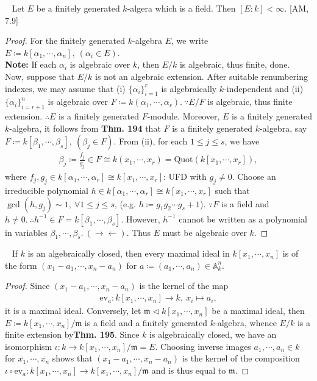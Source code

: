 \documentclass[12pt,a4paper,footinclude=true,headinclude=true]{scrbook} %
\newenvironment{theorem}[2][]
{\renewcommand\theinnercustomthm{#2}\innercustomthm[#1]
\begin{mdframed}[backgroundcolor=yellow!20]\ }
{\end{mdframed}\endinnercustomthm}
\newenvironment{corollary}[2][]
{\renewcommand\theinnercustomcol{#2}\innercustomcol[#1]
\begin{mdframed}[backgroundcolor=gray!20]\ }
{\end{mdframed}\endinnercustomcol}
\begin{document}
\begin{theorem}{195. (Hilbert Weak Nullstellensatz)}
    Let $E$ be a finitely generated $k$-algera which is a field. Then $[E:k]<\infty$. [AM, 7.9]
\end{theorem}
\begin{proof}
    For the finitely generated $k$-algebra $E$, we write $E\coloneqq k[\alpha_1,\cdots,\alpha_n],\ (\alpha_i\in E)$.\\ \textbf{Note:} If each $\alpha_i$ is algebraic over $k$, then $E/k$ is algebraic, thus finite, done.\\ Now, suppose that $E/k$ is not an algebraic extension. After suitable renumbering indexes, we may assume that (i) $\{\alpha_i\}_{i=1}^r$ is algebraically $k$-independent and (ii) $\{\alpha_i\}_{i=r+1}^n$ is algebraic over $F\coloneqq k(\alpha_1,\cdots,\alpha_r).\ \because E/F$ is algebraic, thus finite extension. $\therefore E$ is a finitely generated $F$-module. Moreover, $E$ is a finitely generated $k$-algebra, it follows from \textbf{Thm. 194} that $F$ is a finitely generated $k$-algebra, say $F\coloneqq k[\beta_1,\cdots,\beta_s],\ (\beta_j\in F)$. From (ii), for each $1\leq j\leq s$, we have 
    \begin{align*}
        \beta_j\coloneqq\tfrac{f_j}{g_j}\in F\cong k(x_1,\cdots,x_r) =\mathrm{Quot}(k[x_1,\cdots,x_r]),
    \end{align*}
    where $f_j,g_j\in k[\alpha_1,\cdots,\alpha_r]\cong k[x_1,\cdots,x_r]$: UFD with $g_j\neq0$. Choose an irreducible polynomial $h\in k[\alpha_1,\cdots,\alpha_r]\cong k[x_1,\cdots,x_r]$ such that $\gcd{(h,g_j)}\sim1,\ \forall 1\leq j\leq s$, (e.g. $h\coloneqq g_1g_2\cdots g_s+1$). $\because F$ is a field and $h\neq0.\ \therefore h^{-1}\in F=k[\beta_1,\cdots,\beta_s]$. However, $h^{-1}$ cannot be written as a polynomial in variables $\beta_1,\cdots,\beta_s.\ (\to\gets)$. Thus $E$ must be algebraic over $k$.
\end{proof}

\begin{corollary}{196}
    If $k$ is an algebraically closed, then every maximal ideal in $k[x_1,\cdots,x_n]$ is of the form $(x_1-a_1,\cdots,x_n-a_n)$ for $a\coloneqq(a_1,\cdots,a_n)\in\mathbb{A}_k^n$.
\end{corollary}
\begin{proof}
    Since $(x_1-a_1,\cdots,x_n-a_n)$ is the kernel of the map
    \begin{align*}
        \mathrm{ev}_a:k[x_1,\cdots,x_n]\longrightarrow k,\ x_i\longmapsto a_i,
    \end{align*}
    it is a maximal ideal. Conversely, let $\mathfrak{m}\triangleleft k[x_1,\cdots,x_n]$ be a maximal ideal, then $E\coloneqq k[x_1,\cdots,x_n]/\mathfrak{m}$ is a field and a finitely generated $k$-algebra, whence $E/k$ is a finite extension by\textbf{Thm. 195}. Since $k$ is algebraically closed, we have an isomorphism $\iota:k\to k[x_1,\cdots,x_n]/\mathfrak{m}=E$. Choosing inverse images $a_1,\cdots,a_n\in k$ for $\overline{x_1},\cdots,\overline{x_n}$ shows that $(x_1-a_1,\cdots,x_n-a_n)$ is the kernel of the composition $\iota\circ\mathrm{ev}_a:k[x_1,\cdots,x_n]\to k[x_1,\cdots,x_n]/\mathfrak{m}$ and is thus equal to $\mathfrak{m}$.
\end{proof}
\end{document}
